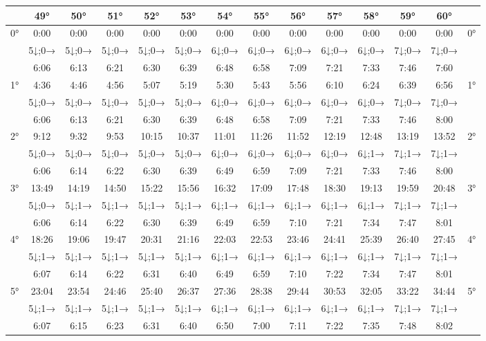 \begin{scriptsize}\begin{tabular}{c || c | c | c | c | c | c | c | c | c | c | c | c || c}
		\space &49°&50°&51°&52°&53°&54°&55°&56°&57°&58°&59°&60°\\\hline\hline
		\multirow{3}{*}{0°}&0:00&0:00&0:00&0:00&0:00&0:00&0:00&0:00&0:00&0:00&0:00&0:00&\multirow{3}{*}{0°}\\ \space&5↓;0→&5↓;0→&5↓;0→&5↓;0→&5↓;0→&6↓;0→&6↓;0→&6↓;0→&6↓;0→&6↓;0→&7↓;0→&7↓;0→&\space\\&6:06&6:13&6:21&6:30&6:39&6:48&6:58&7:09&7:21&7:33&7:46&7:60&\space\\\hline
		\multirow{3}{*}{1°}&4:36&4:46&4:56&5:07&5:19&5:30&5:43&5:56&6:10&6:24&6:39&6:56&\multirow{3}{*}{1°}\\ \space&5↓;0→&5↓;0→&5↓;0→&5↓;0→&5↓;0→&6↓;0→&6↓;0→&6↓;0→&6↓;0→&6↓;0→&7↓;0→&7↓;0→&\space\\&6:06&6:13&6:21&6:30&6:39&6:48&6:58&7:09&7:21&7:33&7:46&8:00&\space\\\hline
		\multirow{3}{*}{2°}&9:12&9:32&9:53&10:15&10:37&11:01&11:26&11:52&12:19&12:48&13:19&13:52&\multirow{3}{*}{2°}\\ \space&5↓;0→&5↓;0→&5↓;0→&5↓;0→&5↓;0→&6↓;0→&6↓;0→&6↓;0→&6↓;0→&6↓;1→&7↓;1→&7↓;1→&\space\\&6:06&6:14&6:22&6:30&6:39&6:49&6:59&7:09&7:21&7:33&7:46&8:00&\space\\\hline
		\multirow{3}{*}{3°}&13:49&14:19&14:50&15:22&15:56&16:32&17:09&17:48&18:30&19:13&19:59&20:48&\multirow{3}{*}{3°}\\ \space&5↓;0→&5↓;1→&5↓;1→&5↓;1→&5↓;1→&6↓;1→&6↓;1→&6↓;1→&6↓;1→&6↓;1→&7↓;1→&7↓;1→&\space\\&6:06&6:14&6:22&6:30&6:39&6:49&6:59&7:10&7:21&7:34&7:47&8:01&\space\\\hline
		\multirow{3}{*}{4°}&18:26&19:06&19:47&20:31&21:16&22:03&22:53&23:46&24:41&25:39&26:40&27:45&\multirow{3}{*}{4°}\\ \space&5↓;1→&5↓;1→&5↓;1→&5↓;1→&5↓;1→&6↓;1→&6↓;1→&6↓;1→&6↓;1→&6↓;1→&7↓;1→&7↓;1→&\space\\&6:07&6:14&6:22&6:31&6:40&6:49&6:59&7:10&7:22&7:34&7:47&8:01&\space\\\hline
		\multirow{3}{*}{5°}&23:04&23:54&24:46&25:40&26:37&27:36&28:38&29:44&30:53&32:05&33:22&34:44&\multirow{3}{*}{5°}\\ \space&5↓;1→&5↓;1→&5↓;1→&5↓;1→&5↓;1→&6↓;1→&6↓;1→&6↓;1→&6↓;1→&6↓;1→&7↓;1→&7↓;1→&\space\\&6:07&6:15&6:23&6:31&6:40&6:50&7:00&7:11&7:22&7:35&7:48&8:02&\space\\\hline

\end{tabular}
\end{scriptsize}

